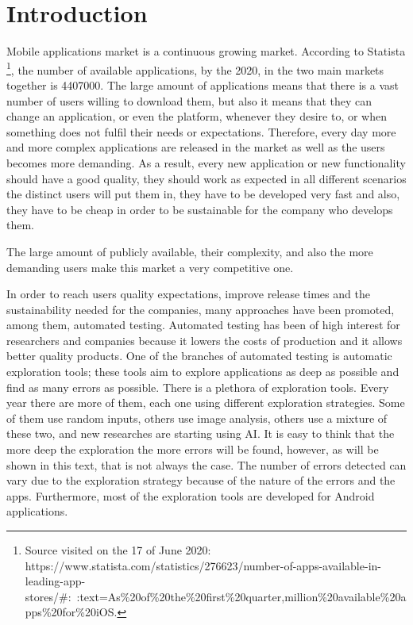
\chapter{Introduction} %

\label{Chapter1} %

Mobile applications market is a continuous growing market. According to Statista \footnote{Source visited on the 17 of June 2020:
https://www.statista.com/statistics/276623/number-of-apps-available-in-leading-app-stores/\#:~:text=As\%20of\%20the\%20first\%20quarter,million\%20available\%20apps\%20for\%20iOS.}, the number of available applications, by the 2020, in the two main markets together is 4407000. The large amount of applications means that there is a vast number of users willing to download them, but also it means that they can change an application, or even the platform, whenever they desire to, or when something does not fulfil their needs or expectations. Therefore, every day more and more complex applications are released in the market as well as the users becomes more demanding. As a result, every new application or new functionality should have a good quality, they should work as expected in all different scenarios the distinct users will put them in, they have to be developed very fast and also, they have to be cheap in order to be sustainable for the company who develops them. 

The large amount of publicly available, their complexity, and also the more demanding users make this market a very competitive one.

In order to reach users quality expectations, improve release times  and the sustainability needed for the companies, many approaches have been promoted, among them, automated testing. Automated testing has been of high interest for researchers and companies because it lowers the costs of production and it allows better quality products. One of the branches of automated testing is automatic exploration tools; these tools aim to explore  applications as deep as possible and find as many errors as possible. There is a plethora of exploration tools. Every year there are more of them, each one using different exploration strategies. Some of them use random inputs, others use image analysis, others use a mixture of these two, and new researches are starting using AI. It is easy to think that the more deep the exploration the more errors will be found, however, as will be shown in this text, that is not always the case. The number of errors detected can vary due to the exploration strategy because of the nature of the errors  and the apps. Furthermore, most of the exploration tools are developed for Android applications.


